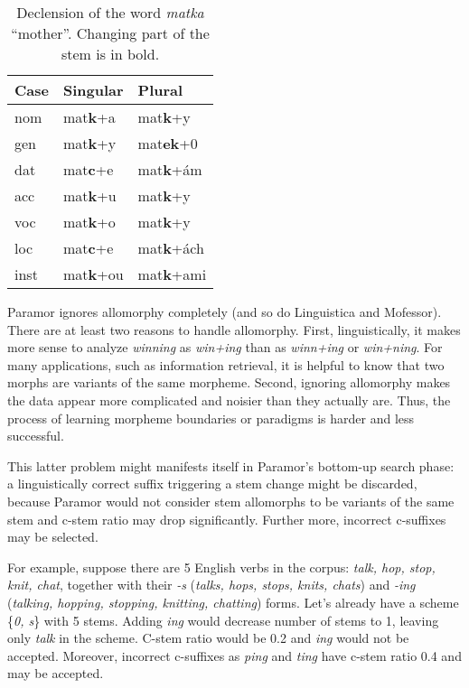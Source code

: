 \documentclass{itatnew}
\newcommand{\gloss}[2]{\emph{#1} ``#2''}
\newcommand{\e}[1]{\textit{#1}} %
\begin{document}
\begin{table}[h]
\begin{center}
\begin{tabular}{|l|ll|}
\hline \bf Case & \bf Singular & \bf Plural \\ \hline
nom & mat\textbf{k}+a & mat\textbf{k}+y \\
gen & mat\textbf{k}+y & mat\textbf{ek}+0 \\
dat & mat\textbf{c}+e & mat\textbf{k}+ám\\
acc & mat\textbf{k}+u & mat\textbf{k}+y \\
voc & mat\textbf{k}+o & mat\textbf{k}+y \\
loc & mat\textbf{c}+e & mat\textbf{k}+ách \\
inst & mat\textbf{k}+ou & mat\textbf{k}+ami \\
\hline
\end{tabular}
\end{center}
\caption{\label{table:matka} Declension of the word \gloss{matka}{mother}. Changing part of the stem is in bold.}
\end{table}


Paramor ignores allomorphy completely (and so do Linguistica and Mofessor).
%
There are at least two reasons to handle allomorphy.
%
First, linguistically,
it  makes  more  sense  to  analyze  \e{winning}  as  \e{win+ing} than as  \e{winn+ing} or \e{win+ning}. For  many  applications, such as information retrieval, it is helpful to know that two morphs are variants of the same morpheme.
%
Second, ignoring allomorphy makes the data appear more complicated and noisier than they actually are. Thus, the process of learning morpheme boundaries or paradigms is harder and less successful.

This latter problem might manifests itself in Paramor's bottom-up search phase: a linguistically correct suffix triggering a stem change might be discarded, because Paramor would not consider stem allomorphs to be variants of the same stem and c-stem ratio may drop significantly. Further more, incorrect c-suffixes may be selected.

For example, suppose there are 5 English verbs in the corpus: \emph{talk, hop, stop, knit, chat}, together with their \emph{-s} (\emph{talks, hops, stops, knits, chats}) and \emph{-ing} (\emph{talking, hopping, stopping, knitting, chatting}) forms. Let's already have a scheme \{\emph{0, s}\} with 5 stems. Adding \emph{ing} would decrease number of stems to 1, leaving only \emph{talk} in the scheme. C-stem ratio would be 0.2 and \emph{ing} would not be accepted. Moreover, incorrect c-suffixes as \emph{ping} and \emph{ting} have c-stem ratio 0.4 and may be accepted.
\end{document}
